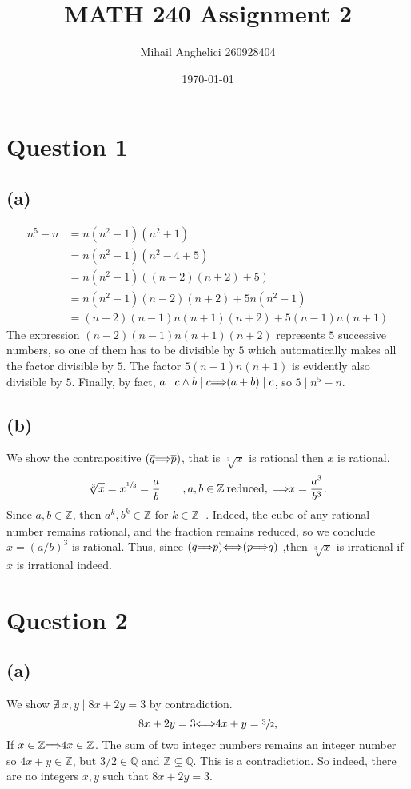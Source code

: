 \documentclass[12pt]{article}
\title{MATH 240 Assignment 2}
\author{Mihail Anghelici 260928404 }
\date{\today}
\let\oldimplies\implies
\let\oldiff\iff
\renewcommand*{\implies}{
	\hspace{-0.05cm}\resizebox{.95\width}{\height}{$\oldimplies$}\hspace{-0.05cm}
}
\renewcommand*{\iff}{
	\hspace{-0.1cm}\oldiff\hspace{-0.1cm}
}
\renewcommand{\bar}{\overline}
\begin{document}
	\maketitle
	\section*{Question 1}
		\subsection*{(a)} 
			\begin{align*}
				n^{5}-n &= n(n^{2}-1) (n^{2}+1)\\
				&=n(n^{2} -1)(n^{2} -4 + 5) \\
				&=n(n^{2} -1 ) ((n-2)(n+2) + 5)\\
				&= n(n^{2} -1)(n-2)(n+2)+5n(n^{2}-1)\\
				&=(n-2)(n-1)n(n+1)(n+2) + 5(n-1)n(n+1) 
			\end{align*}
			The expression $(n-2)(n-1)n(n+1)(n+2)$ represents $5$ successive numbers, so one of them has to be divisible by $5$ which automatically makes all the factor divisible by $5$. The factor $5(n-1)n(n+1)$ is evidently also divisible by $5$. Finally, by fact, $a \mid c \land b \mid c \implies (a+b) \mid c$, so $5 \mid n^{5} -n$. 
		\subsection*{(b)}
			We show the contrapositive $(\bar{q} \implies \bar{p})$, that is $\sqrt[3]{x}$ is rational then $x$ is rational.
			$$ \sqrt[3]{x} = x^{\sfrac{1}{3}} = \frac{a}{b} \qquad, a,b \in \mathbb{Z} \: \text{reduced}, \ \implies x = \frac{a^{3}}{b^{3}}.$$
			Since $a,b \in \mathbb{Z}$, then $a^{k}, b^{k} \in \mathbb{Z}$ for  $k \in \mathbb{Z}_{+}$. Indeed, the cube of any rational number remains rational, and the fraction remains reduced, so we conclude $x = (a/b)^{3}$ is rational. Thus, since $(\bar{q} \implies \bar{p}) \iff (p \implies q)$ ,then $\sqrt[3]{x}$ is irrational if $x$ is irrational indeed.
	\section*{Question 2}
		\subsection*{(a)}
			We show $\nexists \ x,y \mid  8x + 2y =3$ by contradiction.
			$$ 8x + 2y = 3 \iff 4x + y = \sfrac{3}{2},$$
			If $x \in \mathbb{Z} \implies 4x \in \mathbb{Z}$. The sum of two integer numbers remains an integer number so $4x + y \in \mathbb{Z}$, but $3/2 \in \mathbb{Q}$ and $\mathbb{Z} \subsetneq \mathbb{Q}$. This is a contradiction. So indeed, there are no integers $x,y$ such that $8x +2y =3$. 
\end{document}
